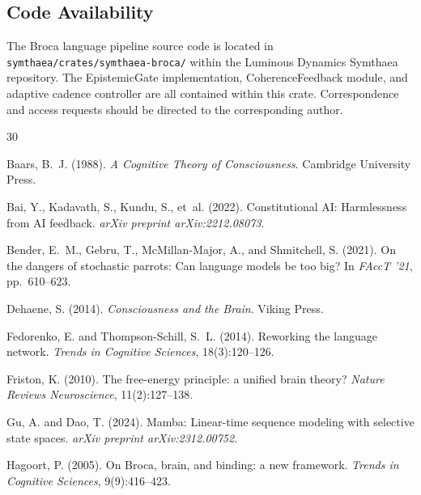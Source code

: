 \documentclass[12pt,a4paper]{article}
\begin{document}
\subsection*{Code Availability}

The Broca language pipeline source code is located in \texttt{symthaea/crates/symthaea-broca/} within the Luminous Dynamics Symthaea repository. The EpistemicGate implementation, CoherenceFeedback module, and adaptive cadence controller are all contained within this crate. Correspondence and access requests should be directed to the corresponding author.


\begin{thebibliography}{30}

Baars, B.~J. (1988).
\newblock \emph{A Cognitive Theory of Consciousness}.
\newblock Cambridge University Press.

Bai, Y., Kadavath, S., Kundu, S., et~al. (2022).
\newblock Constitutional AI: Harmlessness from AI feedback.
\newblock \emph{arXiv preprint arXiv:2212.08073}.

Bender, E.~M., Gebru, T., McMillan-Major, A., and Shmitchell, S. (2021).
\newblock On the dangers of stochastic parrots: Can language models be too big?
\newblock In \emph{FAccT '21}, pp.\ 610--623.

Dehaene, S. (2014).
\newblock \emph{Consciousness and the Brain}.
\newblock Viking Press.

Fedorenko, E. and Thompson-Schill, S.~L. (2014).
\newblock Reworking the language network.
\newblock \emph{Trends in Cognitive Sciences}, 18(3):120--126.

Friston, K. (2010).
\newblock The free-energy principle: a unified brain theory?
\newblock \emph{Nature Reviews Neuroscience}, 11(2):127--138.

Gu, A. and Dao, T. (2024).
\newblock Mamba: Linear-time sequence modeling with selective state spaces.
\newblock \emph{arXiv preprint arXiv:2312.00752}.

Hagoort, P. (2005).
\newblock On Broca, brain, and binding: a new framework.
\newblock \emph{Trends in Cognitive Sciences}, 9(9):416--423.


\end{thebibliography}
\end{document}
